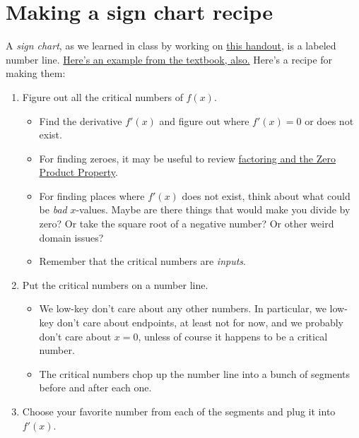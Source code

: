 
\usepackage[dvipsnames]{xcolor}



%


\allowdisplaybreaks
\section{Making a sign chart recipe}
A \textit{sign chart}, as we learned in class by working on \href{https://rhinopotamus.github.io/pdf/highest-and-lowest.pdf}{this handout}, is a labeled number line. \href{https://activecalculus.org/single/sec-3-3-tests.html#Ex-f-from-f-prime}{Here's an example from the textbook, also.} Here's a recipe for making them:

\begin{enumerate}[leftmargin=15pt]
    \item Figure out all the critical numbers of $f(x)$.
    \begin{itemize}
        \item Find the derivative $f'(x)$ and figure out where $f'(x) = 0$ or does not exist.
        \item For finding zeroes, it may be useful to review \href{https://spot.pcc.edu/math/orcca/ed2/html/section-solving-quadratic-equations-by-factoring.html}{factoring and the Zero Product Property}.
        \item For finding places where $f'(x)$ does not exist, think about what could be \textit{bad} $x$-values. Maybe are there things that would make you divide by zero? Or take the square root of a negative number? Or other weird domain issues?
        \item Remember that the critical numbers are \textit{inputs}.
    \end{itemize}
    \item Put the critical numbers on a number line. 
    \begin{itemize}
        \item We low-key don't care about any other numbers. In particular, we low-key don't care about endpoints, at least not for now, and we probably don't care about $x=0$, unless of course it happens to be a critical number.
        \item The critical numbers chop up the number line into a bunch of segments before and after each one.
    \end{itemize}
    \item Choose your favorite number from each of the segments and plug it into $f'(x)$.

\end{enumerate}
